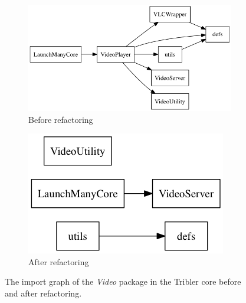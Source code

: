 \begin{figure}
	\centering
	\begin{subfigure}{.5\textwidth}
		\centering
		\includegraphics[width=.9\linewidth]{images/implementation/output_video_nov15}
		\caption{Before refactoring}
		\label{fig:video-package-refactoring-before}
	\end{subfigure}%
	\begin{subfigure}{.5\textwidth}
		\centering
		\includegraphics[width=.7\linewidth]{images/implementation/output_video_july16}
		\caption{After refactoring}
		\label{fig:video-package-refactoring-after}
	\end{subfigure}
	\caption{The import graph of the \emph{Video} package in the Tribler core before and after refactoring.}
	\label{fig:video-package-refactoring}
\end{figure}

